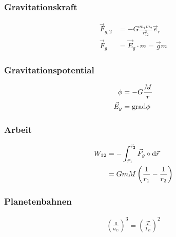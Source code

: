 \begin{multicols}{2}{}
\subsubsection{Gravitationskraft}
\begin{align*}
\vec{F}_{g,2}&=-G\frac{m_1m_2}{r_{12}^2}\vec{e}_r\\
\vec{F}_g&=\vec{E}_g\cdot m=\vec{g}m
\end{align*}
\hfill

\subsubsection{Gravitationspotential}
\begin{align*}
\phi&=-G\frac{M}{r}\\
\vec{E}_g&=\mathop{}\!\mathrm{grad}\phi
\end{align*}
\hfill
\end{multicols}

\begin{multicols}{2}{}
\subsubsection{Arbeit}
\begin{align*}
W_{12}&=-\int_{\vec{r}_1}^{\vec{r}_2}\vec{F}_g\circ\mathop{}\!\mathrm{d}\vec{r}\\
&=GmM\left(\frac{1}{r_1}-\frac{1}{r_2}\right)
\end{align*}

\subsubsection{Planetenbahnen}
\begin{align*}
\left(\frac{a}{a_E}\right)^3=\left(\frac{T}{T_E}\right)^2
\end{align*}
\hfill
\end{multicols}
